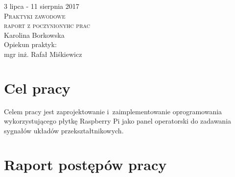 \documentclass[a4paper, 12pt]{article}
\begin{document}
\begin{titlepage}
	\begin{center}
		\Large{3 lipca - 11 sierpnia 2017} \\
		[2cm]
		\Huge{\textsc{Praktyki zawodowe}} \\
		\large{\textsc{raport z poczynionyhc prac}}\\ 
		[10cm]
		\Large{Karolina Borkowska}\\ 
		[1cm]
		\large{Opiekun praktyk:}\\
		\Large{mgr inż. Rafał Miśkiewicz}
	\end{center}
\end{titlepage}


\tableofcontents
\newpage

\section{Cel pracy}
Celem pracy jest zaprojektowanie i~zaimplementowanie oprogramowania 
 wykorzystującego płytkę Raspberry Pi jako panel operatorski do zadawania sygnałów układów przekształtnikowych.
\section{Raport postępów pracy}
\end{document}
